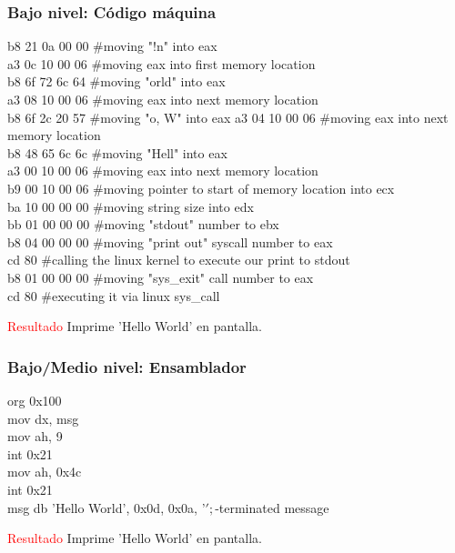 \begin{frame}
    \frametitle{Bajo nivel: C\'odigo m\'aquina} 
        b8    21 0a 00 00   \#moving "!n" into eax \\
        a3    0c 10 00 06   \#moving eax into first memory location \\
        b8    6f 72 6c 64   \#moving "orld" into eax \\
        a3    08 10 00 06   \#moving eax into next memory location \\
        b8    6f 2c 20 57   \#moving "o, W" into eax
        a3    04 10 00 06   \#moving eax into next memory location \\
        b8    48 65 6c 6c   \#moving "Hell" into eax \\
        a3    00 10 00 06   \#moving eax into next memory location \\
        b9    00 10 00 06   \#moving pointer to start of memory location into ecx \\
        ba    10 00 00 00   \#moving string size into edx \\
        bb    01 00 00 00   \#moving "stdout" number to ebx \\
        b8    04 00 00 00   \#moving "print out" syscall number to eax \\
        cd    80            \#calling the linux kernel to execute our print to stdout \\
        b8    01 00 00 00   \#moving "sys\_exit" call number to eax \\
        cd    80            \#executing it via linux sys\_call \\
        \pause \par
        \textcolor{red}{Resultado} \pause Imprime 'Hello World' en pantalla.
\end{frame}

\begin{frame}
\frametitle{Bajo/Medio nivel: Ensamblador}
    org  0x100       \\
    mov  dx, msg      \\
    mov  ah, 9        \\
    int  0x21         \\
    mov  ah, 0x4c     \\
    int  0x21         \\
    msg  db 'Hello World', 0x0d, 0x0a, '$'   ; $-terminated message \\
    \pause \par
    \textcolor{red}{Resultado} \pause Imprime 'Hello World' en pantalla.
\end{frame}

